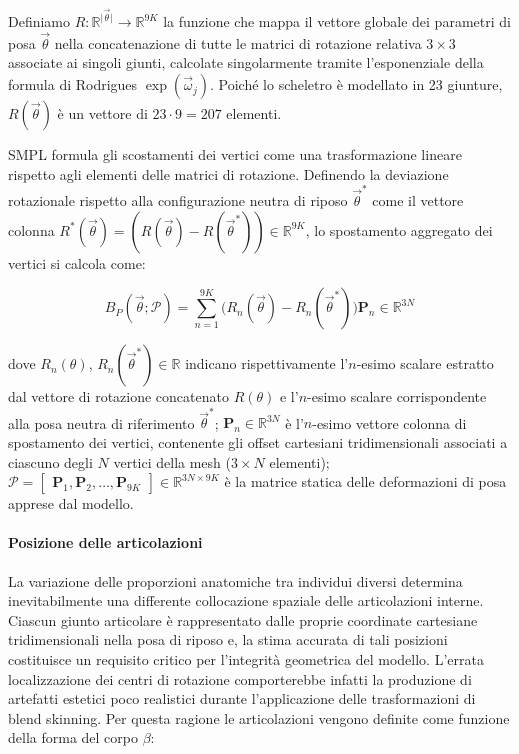 Definiamo $R: \mathbb{R}^{\vert \vec{\theta} \vert} \to \mathbb{R}^{9K}$ la funzione che mappa il vettore globale dei parametri di posa $\vec{\theta}$ nella concatenazione di tutte le matrici di rotazione relativa $3 \times 3$ associate ai singoli giunti, calcolate singolarmente tramite l'esponenziale della formula di Rodrigues $\exp(\vec{\omega}_j)$.
Poiché lo scheletro è modellato in 23 giunture, $R(\vec{\theta})$ è un vettore di $23 \cdot 9 = 207$ elementi.

SMPL formula gli scostamenti dei vertici come una trasformazione lineare rispetto agli elementi delle matrici di rotazione.
Definendo la deviazione rotazionale rispetto alla configurazione neutra di riposo $\vec{\theta}^*$ come il vettore colonna $R^*(\vec{\theta}) = (R(\vec{\theta}) - R(\vec{\theta}^*)) \in \mathbb{R}^{9K}$, lo spostamento aggregato dei vertici si calcola come:

\begin{equation}
B_P(\vec{\theta}; \mathcal{P}) = \sum_{n=1}^{9K} \big(R_n(\vec{\theta}) - R_n(\vec{\theta}^*)\big) \mathbf{P}_n \in \mathbb{R}^{3N}
\end{equation}

dove $R_n(\theta), \, R_n(\vec{\theta}^*) \in \mathbb{R}$ indicano rispettivamente l'$n$-esimo scalare estratto dal vettore di rotazione concatenato $R(\theta)$ e l'$n$-esimo scalare corrispondente alla posa neutra di riferimento $\vec{\theta}^*$;
$\mathbf{P}_n \in \mathbb{R}^{3N}$ è l'$n$-esimo vettore colonna di spostamento dei vertici, contenente gli offset cartesiani tridimensionali associati a ciascuno degli $N$ vertici della mesh ($3 \times N$ elementi);
$\mathcal{P} = \begin{bmatrix} \mathbf{P}_1, \mathbf{P}_2, \dots, \mathbf{P}_{9K} \end{bmatrix} \in \mathbb{R}^{3N \times 9K}$ è la matrice statica delle deformazioni di posa apprese dal modello.


\paragraph{Posizione delle articolazioni}

La variazione delle proporzioni anatomiche tra individui diversi determina inevitabilmente una differente collocazione spaziale delle articolazioni interne.
Ciascun giunto articolare è rappresentato dalle proprie coordinate cartesiane tridimensionali nella posa di riposo e, la stima accurata di tali posizioni costituisce un requisito critico per l'integrità geometrica del modello.
L'errata localizzazione dei centri di rotazione comporterebbe infatti la produzione di artefatti estetici poco realistici durante l'applicazione delle trasformazioni di blend skinning.
Per questa ragione le articolazioni vengono definite come funzione della forma del corpo $\beta$:

